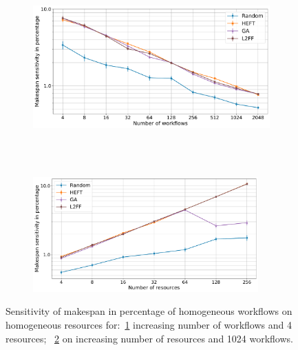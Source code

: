 \begin{figure}[ht!]
    \centering
    \begin{subfigure}[b]{0.75\textwidth}
        \includegraphics[width=.95\textwidth]{figures/campaign/StHomoCampaigns_4DynHomoResourcesSens.pdf}
        \caption{}
        \label{fig:StHomoCampaigns_4DyHomoResourcesSens}
    \end{subfigure}\\
    ~
    \begin{subfigure}[b]{0.75\textwidth}
        \includegraphics[width=0.95\textwidth]{figures/campaign/DynHomoResources_StHomoCampaignsSens.pdf}
        \caption{}
        \label{fig:DyHomoResources_StHomoCampaignsSens}
    \end{subfigure}
    \caption{Sensitivity of makespan in percentage of homogeneous workflows on homogeneous resources for:~\ref{fig:StHomoCampaigns_4DyHomoResourcesSens} increasing number of workflows and 4 resources;
        ~\ref{fig:DyHomoResources_StHomoCampaignsSens} on increasing number of resources and 1024 workflows.}
    \label{fig:dyn_homog_sens_analysis}
\end{figure}

